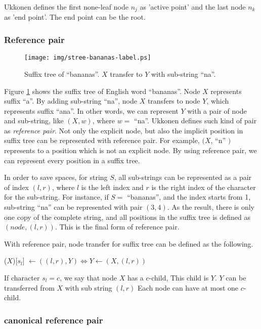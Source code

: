 \documentclass[UTF8]{article}
\begin{document}
Ukkonen defines the first none-leaf node $n_j$ as 'active point' and the last
node $n_k$ as 'end point'. The end point can be the root.

\subsubsection{Reference pair}

\begin{figure}[htbp]
  \centering
  \texttt{[image: img/stree-bananas-label.ps]}
  \caption{Suffix tree of ``bananas''. $X$ transfer to $Y$ with sub-string ``na''.}
  \label{fig:stree-bananas-label}
\end{figure}

Figure \ref{fig:stree-bananas-label} shows the suffix tree of English word ``bananas''.
Node $X$ represents suffix ``a''. By adding sub-string ``na'', node $X$ transfers
to node $Y$, which represents suffix ``ana''.
In other words, we can
represent $Y$ with a pair of node and sub-string, like $(X, w)$, where $w=$ ``na''.
Ukkonen defines
such kind of pair as {\em reference pair}. Not only the explicit node, but also the
implicit position in suffix tree can be represented with reference pair. For example,
$(X$, ``n'' $)$ represents to a position which is not an explicit node. By using reference
pair, we can represent every position in a suffix tree.

In order to save spaces, for string $S$, all sub-strings can
be represented as a pair of index $(l, r)$, where $l$ is the left index and $r$ is the
right index of the character for the sub-string. For instance, if $S=$ ``bananas'', and the
index starts from 1, sub-string ``na'' can be represented with pair $(3, 4)$. As the result,
there is only one copy of the complete string, and all positions in the suffix tree
is defined as $(node, (l, r))$. This is the final form of reference pair.

With reference pair, node transfer for suffix tree can be defined as the following.

($X$)[$s_l$] $\gets ((l, r), Y) \iff Y \gets (X, (l, r))$

If character $s_l=c$, we say that node $X$ has a $c$-child, This child is $Y$.
$Y$ can be transferred from $X$ with sub string $(l, r)$
Each node can have at most one $c$-child.

\subsubsection{canonical reference pair}
\end{document}
